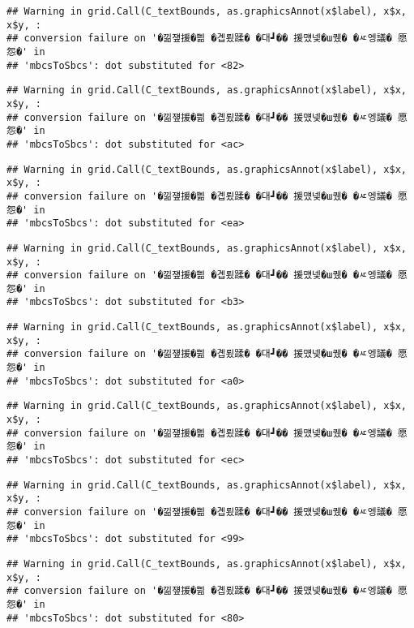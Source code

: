 \documentclass[
]{article}
\begin{document}
\begin{verbatim}
## Warning in grid.Call(C_textBounds, as.graphicsAnnot(x$label), x$x, x$y, :
## conversion failure on '�낆쟾援�쁾 �곕룄蹂� �대┛�� 援먰넻�ш퀬� �ㅼ엥議� 愿怨�' in
## 'mbcsToSbcs': dot substituted for <82>
\end{verbatim}

\begin{verbatim}
## Warning in grid.Call(C_textBounds, as.graphicsAnnot(x$label), x$x, x$y, :
## conversion failure on '�낆쟾援�쁾 �곕룄蹂� �대┛�� 援먰넻�ш퀬� �ㅼ엥議� 愿怨�' in
## 'mbcsToSbcs': dot substituted for <ac>
\end{verbatim}

\begin{verbatim}
## Warning in grid.Call(C_textBounds, as.graphicsAnnot(x$label), x$x, x$y, :
## conversion failure on '�낆쟾援�쁾 �곕룄蹂� �대┛�� 援먰넻�ш퀬� �ㅼ엥議� 愿怨�' in
## 'mbcsToSbcs': dot substituted for <ea>
\end{verbatim}

\begin{verbatim}
## Warning in grid.Call(C_textBounds, as.graphicsAnnot(x$label), x$x, x$y, :
## conversion failure on '�낆쟾援�쁾 �곕룄蹂� �대┛�� 援먰넻�ш퀬� �ㅼ엥議� 愿怨�' in
## 'mbcsToSbcs': dot substituted for <b3>
\end{verbatim}

\begin{verbatim}
## Warning in grid.Call(C_textBounds, as.graphicsAnnot(x$label), x$x, x$y, :
## conversion failure on '�낆쟾援�쁾 �곕룄蹂� �대┛�� 援먰넻�ш퀬� �ㅼ엥議� 愿怨�' in
## 'mbcsToSbcs': dot substituted for <a0>
\end{verbatim}

\begin{verbatim}
## Warning in grid.Call(C_textBounds, as.graphicsAnnot(x$label), x$x, x$y, :
## conversion failure on '�낆쟾援�쁾 �곕룄蹂� �대┛�� 援먰넻�ш퀬� �ㅼ엥議� 愿怨�' in
## 'mbcsToSbcs': dot substituted for <ec>
\end{verbatim}

\begin{verbatim}
## Warning in grid.Call(C_textBounds, as.graphicsAnnot(x$label), x$x, x$y, :
## conversion failure on '�낆쟾援�쁾 �곕룄蹂� �대┛�� 援먰넻�ш퀬� �ㅼ엥議� 愿怨�' in
## 'mbcsToSbcs': dot substituted for <99>
\end{verbatim}

\begin{verbatim}
## Warning in grid.Call(C_textBounds, as.graphicsAnnot(x$label), x$x, x$y, :
## conversion failure on '�낆쟾援�쁾 �곕룄蹂� �대┛�� 援먰넻�ш퀬� �ㅼ엥議� 愿怨�' in
## 'mbcsToSbcs': dot substituted for <80>
\end{verbatim}
\end{document}
